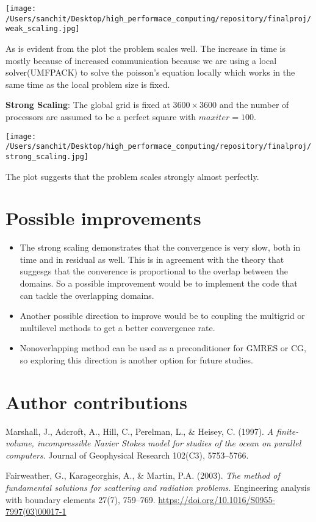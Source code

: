 \documentclass{article}
\begin{document}
	\texttt{[image: /Users/sanchit/Desktop/high\_performace\_computing/repository/finalproj/weak\_scaling.jpg]}
	
	As is evident from the plot the problem scales well. The increase in time is mostly because of increased communication because we are using a local solver(UMFPACK) to solve the poisson's equation locally which works in the same time as the local problem size is fixed.
	
	\textbf{Strong Scaling}: The global grid is fixed at $3600\times3600$ and the number of processors are assumed to be a perfect square with $max iter=100$.
	
		\texttt{[image: /Users/sanchit/Desktop/high\_performace\_computing/repository/finalproj/strong\_scaling.jpg]}

The plot suggests that the problem scales strongly almost perfectly. 
	\section{Possible improvements}
	\begin{itemize}
\item	The strong scaling demonstrates that the convergence is very slow, both in time and in residual as well. This is in agreement with the theory that suggesgs that the converence is proportional to the overlap between the domains. So a possible improvement would be to implement the code that can tackle the overlapping domains. 
\item Another possible direction to improve would be to coupling the multigrid or multilevel methods to get a better convergence rate.
\item Nonoverlapping method can be used as a preconditioner for GMRES or CG, so exploring this direction is another option for future studies.
	\end{itemize}

	\section{Author contributions}
	
	\begin{thebibliography}{9}
		Marshall, J., Adcroft, A., Hill, C., Perelman, L., \& Heisey, C.
		(1997).
		\emph{A finite-volume, incompressible Navier Stokes model for studies of the ocean on parallel computers}.
		Journal of Geophysical Research 
		102(C3), 5753--5766.
		
		Fairweather, G., Karageorghis, A., \& Martin, P.A.
		(2003).
		\emph{The method of fundamental solutions for scattering and radiation problems}.
		Engineering analysis with boundary elements   
		27(7), 759--769.
		\url{https://doi.org/10.1016/S0955-7997(03)00017-1}
		
	\end{thebibliography}
\end{document}
